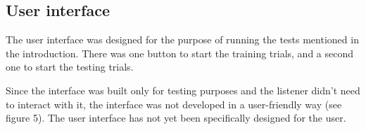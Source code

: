 \documentclass[journal]{IEEEtran}
\begin{document}


\subsection{User interface}
The user interface was designed for the purpose of running the tests mentioned in the introduction. There was one button to start the training trials, and a second one to start the testing trials. 

Since the interface was built only for testing purposes and the listener didn't need to interact with it, the interface was not developed in a user-friendly way (see figure 5). The user interface has not yet been specifically designed for the user.
\end{document}
